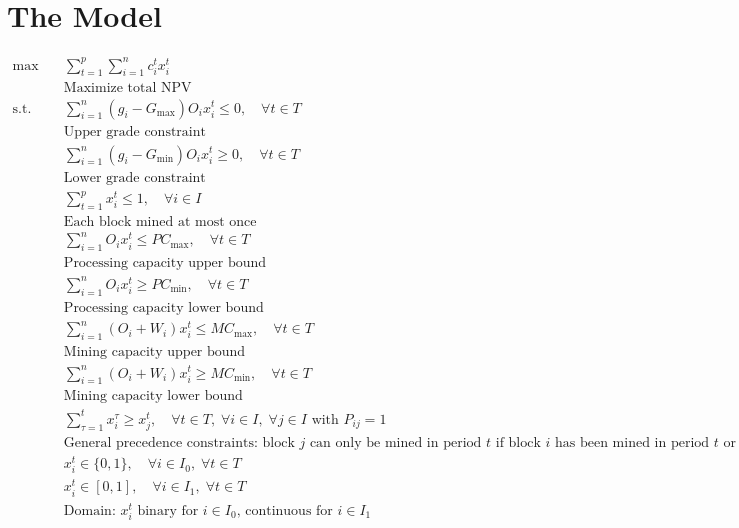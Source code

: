 \documentclass{article}
\begin{document}
\section{The Model}
\begin{align*}
    \max \quad & \sum_{t=1}^{p} \sum_{i=1}^{n} c_i^t x_i^t \\
    & \text{Maximize total NPV} \\[6pt]
    \text{s.t.} \quad 
    & \sum_{i=1}^{n} (g_i - G_{\max}) O_i x_i^t \leq 0, \quad \forall t \in T \\
    & \text{Upper grade constraint} \\[6pt]
    & \sum_{i=1}^{n} (g_i - G_{\min}) O_i x_i^t \geq 0, \quad \forall t \in T \\
    & \text{Lower grade constraint} \\[6pt]
    & \sum_{t=1}^{p} x_i^t \leq 1, \quad \forall i \in I \\
    & \text{Each block mined at most once} \\[6pt]
    & \sum_{i=1}^{n} O_i x_i^t \leq PC_{\max}, \quad \forall t \in T \\
    & \text{Processing capacity upper bound} \\[6pt]
    & \sum_{i=1}^{n} O_i x_i^t \geq PC_{\min}, \quad \forall t \in T \\
    & \text{Processing capacity lower bound} \\[6pt]
    & \sum_{i=1}^{n} (O_i + W_i) x_i^t \leq MC_{\max}, \quad \forall t \in T \\
    & \text{Mining capacity upper bound} \\[6pt]
    & \sum_{i=1}^{n} (O_i + W_i) x_i^t \geq MC_{\min}, \quad \forall t \in T \\
    & \text{Mining capacity lower bound} \\[6pt]
    & \sum_{\tau=1}^{t} x_i^{\tau} \geq x_j^t, \quad \forall t \in T,\; \forall i \in I,\; \forall j \in I \text{ with } P_{ij} = 1 \\
    & \text{General precedence constraints: block $j$ can only be mined in period $t$ if block $i$ has been mined in period $t$ or earlier} \\[6pt]
    & x_i^t \in \{0,1\}, \quad \forall i \in I_0,\; \forall t \in T \\
    & x_i^t \in [0,1], \quad \forall i \in I_1,\; \forall t \in T \\
    & \text{Domain: $x_i^t$ binary for $i \in I_0$, continuous for $i \in I_1$}
\end{align*}
\end{document}
